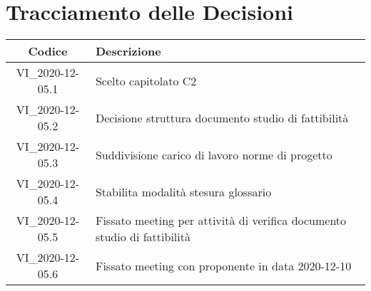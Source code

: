 \section*{Tracciamento delle Decisioni}

\begin{center}
	\begin{longtable}{|c|p{14.5cm}|}
	\hline
	\rowcolor{lighter-grayer}
	\textbf{Codice} & \textbf{Descrizione} \\
	\hline
	\endfirsthead

	\hline
	VI\_2020-12-05.1 & Scelto capitolato C2 \\
	VI\_2020-12-05.2 & Decisione struttura documento studio di fattibilità \\
	VI\_2020-12-05.3 & Suddivisione carico di lavoro norme di progetto \\
	VI\_2020-12-05.4 & Stabilita modalità stesura glossario \\
	VI\_2020-12-05.5 & Fissato meeting per attività di verifica documento studio di fattibilità \\
	VI\_2020-12-05.6 & Fissato meeting con proponente in data 2020-12-10 \\
	\hline

	\end{longtable}
\end{center}